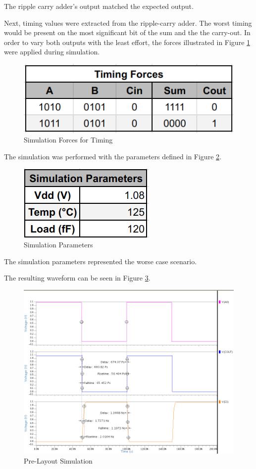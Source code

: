 \documentclass[11pt]{article}
\begin{document}
	The ripple carry adder's output matched the expected output.

	Next, timing values were extracted from the ripple-carry adder. The worst timing would be present on the most significant bit of the sum and the the carry-out. In order to vary both outputs with the least effort, the forces illustrated in Figure \ref{fig:simulation-forces-for-timing-results} were applied during simulation.

	\begin{figure}[H]
		\centering
		\includegraphics[width=0.7\linewidth]{"Pictures/Simulation Forces for Timing Results"}
		\caption{Simulation Forces for Timing}
		\label{fig:simulation-forces-for-timing-results}
	\end{figure}

	The simulation was performed with the parameters defined in Figure \ref{fig:simulation-parameters}.

	\begin{figure}[H]
		\centering
		\includegraphics[width=0.3\linewidth]{"Pictures/Simulation Parameters"}
		\caption{Simulation Parameters}
		\label{fig:simulation-parameters}
	\end{figure}
	
	The simulation parameters represented the worse case scenario.
	
	The resulting waveform can be seen in Figure \ref{fig:prelayout-simulation}.

	\begin{figure}[H]
		\centering
		\includegraphics[width=1\linewidth]{"Pictures/PreLayout Simulation"}
		\caption{Pre-Layout Simulation}
		\label{fig:prelayout-simulation}
	\end{figure}
\end{document}
